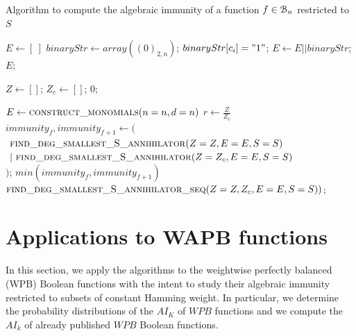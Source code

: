 \documentclass[11pt]{llncs}
\begin{document}
\begin{algorithm}[H]\label{alg:fullAlg3ForAIRestrictesSetOpt}
    \caption{Algorithm to compute the algebraic immunity of a function $f\in \mathcal{B}_{n}$ restricted to $S$}
    \begin{algorithmic}[1]

        \State $E \leftarrow [\ ]$\;
            \State $binaryStr\leftarrow array\left((0)_{2,n}\right)$;
                \State $binaryStr[c_i] = "1"$;
            \EndFor
            \State $E \gets E || binaryStr$;
        \EndFor
        \State \Return $E$;
		\EndFunction
        \State

        \State $Z \leftarrow []$;
        \State $Z_c \leftarrow []$;
        \EndFor
            \State \Return $0$;
        \EndIf
        \State

        \State $E \leftarrow \mbox{\textsc{construct\_monomials}}(n=n, d=n)$\;
        \State $r\gets \frac{Z}{Z_c}$\;
            \State $immunity_f, immunity_{f+1} \leftarrow ($\\
		$\ \mbox{\textsc{find\_deg\_smallest\_S\_annihilator}}(Z=Z, E=E, S=S)$\\
		$\ |\ \mbox{\textsc{find\_deg\_smallest\_S\_annihilator}}(Z=Z_c, E=E, S=S)$\\
		$)$;
            \State \Return $min{\left(immunity_f, immunity_{f+1}\right)}$
        \Else
            \State \Return $\mbox{\textsc{find\_deg\_smallest\_S\_annihilator\_seq}}(Z=Z, Z_c, E=E, S=S))$;
        \EndIf
    \end{algorithmic}
\end{algorithm}
\section{Applications to WAPB functions}
In this section, we apply the algorithms to the weightwise perfectly balanced (WPB) Boolean functions with the intent to study their algebraic immunity restricted to subsets of constant Hamming weight. In particular, we determine the probability distributions of the $AI_K$ of $WPB$ functions and we compute the $AI_k$ of already published $WPB$ Boolean functions.
\end{document}
